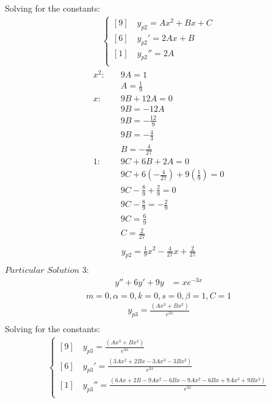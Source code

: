 \documentclass{article}
\begin{document}
        Solving for the constants:
    \begin{align*}
        \begin{cases}
           [9] \quad y_{p2} = Ax^{2} + Bx + C \\
            [6] \quad y_{p2}' = 2Ax + B \\
            [1] \quad y_{p2}'' = 2A \\
        \end{cases}
    \end{align*}
    \begin{align*}
        x^{2}: \quad & 9A = 1 \\
        & A = \frac{1}{9} \\
        x: \quad & 9B + 12A = 0 \\
        & 9B = -12A \\
        & 9B = -\frac{12}{9} \\
        & 9B = -\frac{4}{3} \\
        & B = -\frac{4}{27} \\
        1: \quad & 9C + 6B + 2A = 0 \\
        & 9C + 6\left(-\frac{4}{27}\right) + 9\left(\frac{1}{9}\right) = 0 \\
        & 9C - \frac{8}{9} + \frac{2}{9} = 0 \\
        & 9C - \frac{8}{9} = -\frac{2}{9} \\
        & 9C = \frac{6}{9} \\
        & C = \frac{2}{27} \\
    \end{align*}
    \begin{align*}
        y_{p2} = \frac{1}{9}x^{2} - \frac{4}{27}x + \frac{2}{27} \\
    \end{align*}
    $Particular$ $Solution$ $3:$
    \begin{align*}
        y'' + 6y' + 9y &= xe^{-3x} \\
    \end{align*}
        $$m = 0, \alpha = 0, k = 0, s = 0, \beta = 1, C = 1$$
    \begin{align*}
        y_{p3} = \frac{(Ax^{3} + Bx^{2})}{e^{3x}}\\
    \end{align*}
        Solving for the constants:
    \begin{align*}
        \begin{cases}
            [9] \quad y_{p3} = \frac{(Ax^{3} + Bx^{2})}{e^{3x}} \\
            [6] \quad y_{p3}' = \frac{(3Ax^{2} + 2Bx - 3Ax^3 -3Bx^{2})}{e^{3x}} \\
            [1] \quad y_{p3}'' = \frac{(6Ax + 2B - 9Ax^{2} -6Bx -9Ax^{2} -6Bx + 9Ax^{3} + 9Bx^{2})}{e^{3x}} \\
        \end{cases}
    \end{align*}
\end{document}
